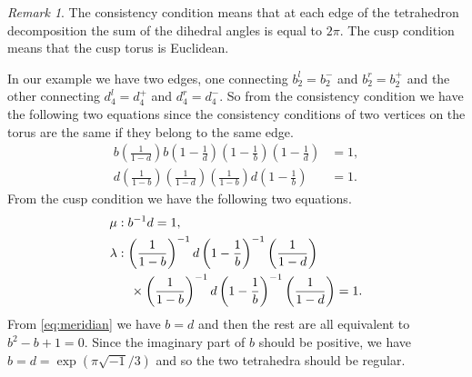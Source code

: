 \documentclass[a4paper]{amsart}
\theoremstyle{plain}
\theoremstyle{definition}
\theoremstyle{remark}
\newtheorem{rem}[thm]{Remark}
\numberwithin{equation}{section}
\numberwithin{figure}{section}
\begin{document}
\begin{rem}
The consistency condition means that at each edge of the tetrahedron
decomposition the sum of the dihedral angles is equal to $2\pi$.
The cusp condition means that the cusp torus is Euclidean.
\end{rem}
\par
In our example we have two edges, one connecting $b_2^l=b_2^-$ and
$b_2^r=b_2^+$
and the other connecting $d_4^l=d_4^+$ and $d_4^r=d_4^-$.
So from the consistency condition we have the following two equations
since the consistency conditions of two vertices on the torus are the
same if they belong to the same edge.
\begin{align*}
  b\left(\frac{1}{1-d}\right)b\left(1-\frac{1}{d}\right)
  \left(1-\frac{1}{b}\right)\left(1-\frac{1}{d}\right)&=1,
  \\
  d\left(\frac{1}{1-b}\right)\left(\frac{1}{1-d}\right)
  \left(\frac{1}{1-b}\right)d\left(1-\frac{1}{b}\right)&=1.
\end{align*}
From the cusp condition we have the following two equations.
\begin{align}
  \mu&: b^{-1}d=1,
  \label{eq:meridian}
  \\
  \lambda&:
  \left(\frac{1}{1-b}\right)^{-1}d
  \left(1-\frac{1}{b}\right)^{-1}\left(\frac{1}{1-d}\right)
  \\
  &\quad\times\left(\frac{1}{1-b}\right)^{-1}d
  \left(1-\frac{1}{b}\right)^{-1}\left(\frac{1}{1-d}\right)
  =1.\notag
\end{align}
From \eqref{eq:meridian} we have $b=d$ and then the rest are all equivalent
to $b^2-b+1=0$.
Since the imaginary part of $b$ should be positive, we have
$b=d=\exp(\pi\sqrt{-1}/3)$ and so the two tetrahedra should be regular.
\end{document}
